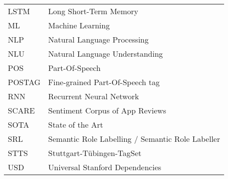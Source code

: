 \begin{supertabular}{lp{12.5cm}}
LSTM    & Long Short-Term Memory\\
ML      & Machine Learning\\
NLP     & Natural Language Processing\\
NLU     & Natural Language Understanding\\
POS     & Part-Of-Speech\\
POSTAG  & Fine-grained Part-Of-Speech tag\\
RNN     & Recurrent Neural Network\\
SCARE   & Sentiment Corpus of App Reviews\\
SOTA    & State of the Art\\
SRL     & Semantic Role Labelling / Semantic Role Labeller\\
STTS    & Stuttgart-Tübingen-TagSet\\
USD     & Universal Stanford Dependencies\\
\end{supertabular}

\newpage
